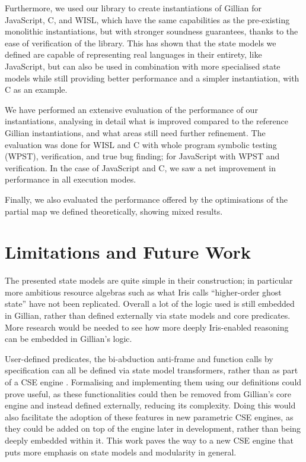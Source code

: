 Furthermore, we used our library to create instantiations of Gillian for JavaScript, C, and WISL, which have the same capabilities as the pre-existing monolithic instantiations, but with stronger soundness guarantees, thanks to the ease of verification of the library. This has shown that the state models we defined are capable of representing real languages in their entirety, like JavaScript, but can also be used in combination with more specialised state models while still providing better performance and a simpler instantiation, with C as an example.

We have performed an extensive evaluation of the performance of our instantiations, analysing in detail what is improved compared to the reference Gillian instantiations, and what areas still need further refinement. The evaluation was done for WISL and C with whole program symbolic testing (WPST), verification, and true bug finding; for JavaScript with WPST and verification. In the case of JavaScript and C, we saw a net improvement in performance in all execution modes.

Finally, we also evaluated the performance offered by the optimisations of the partial map we defined theoretically, showing mixed results.

\section{Limitations and Future Work}

The presented state models are quite simple in their construction; in particular more ambitious resource algebras such as what Iris calls ``higher-order ghost state'' \cite{iris} have not been replicated. Overall a lot of the logic used is still embedded in Gillian, rather than defined externally via state models and core predicates. More research would be needed to see how more deeply Iris-enabled reasoning can be embedded in Gillian's logic.

User-defined predicates, the bi-abduction anti-frame and function calls by specification can all be defined via state model transformers, rather than as part of a CSE engine \cite{sacha-phd}. Formalising and implementing them using our definitions could prove useful, as these functionalities could then be removed from Gillian's core engine and instead defined externally, reducing its complexity. Doing this would also facilitate the adoption of these features in new parametric CSE engines, as they could be added on top of the engine later in development, rather than being deeply embedded within it. This work paves the way to a new CSE engine that puts more emphasis on state models and modularity in general.

